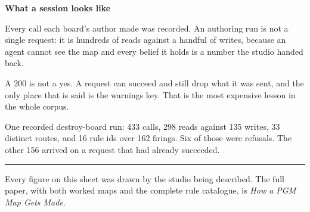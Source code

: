 \documentclass[a1paper,landscape]{article}
\newcommand{\id}[1]{{\ttfamily #1}}
\begin{document}
\noindent\begin{minipage}[t]{\textwidth}
\noindent
{}
\hfill
{}
\hfill
\begin{minipage}[t]{0.58\textwidth}
  {\sffamily\bfseries\color{ink} What a session looks like}\par\vspace{8pt}
  {\color{ink60}\small Every call each board's author made was recorded. An
  authoring run is not a single request: it is hundreds of reads against a handful
  of writes, because an agent cannot see the map and every belief it holds is a
  number the studio handed back.}\par\vspace{10pt}
  {\color{ink60}\small A 200 is not a yes. A request can succeed and still drop
  what it was sent, and the only place that is said is the \id{warnings} key. That
  is the most expensive lesson in the whole corpus.}\par\vspace{10pt}
  {\color{ink60}\small One recorded destroy-board run: 433 calls, 298 reads
  against 135 writes, 33 distinct routes, and 16 rule ids over 162 firings. Six of
  those were refusals. The other 156 arrived on a request that had already
  succeeded.}
\end{minipage}
\end{minipage}

\vspace{12pt}
{\color{rule}\rule{\textwidth}{1pt}}\par\vspace{6pt}
{\footnotesize\sffamily\color{ink60}
Every figure on this sheet was drawn by the studio being described.
The full paper, with both worked maps and the complete rule catalogue, is
\textit{How a PGM Map Gets Made}.}
\end{document}

